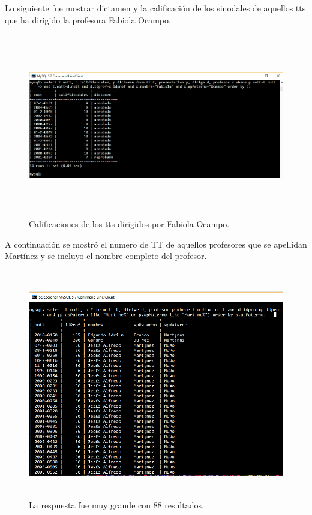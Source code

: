 \documentclass[12pt, titlepage]{article}
\begin{document}
	Lo siguiente fue mostrar dictamen y la calificación de los sinodales de aquellos tts que ha dirigido la profesora Fabiola Ocampo.
	
	\begin{figure}[H]
		\begin{center}
			\includegraphics[width=16cm, height=8cm]{img/tres.png}
			\caption{Calificaciones de los tts dirigidos por Fabiola Ocampo.}
			\label{fig:tres}
		\end{center}
	\end{figure}
	
	A continuación se mostró el numero de TT de aquellos profesores que se apellidan Martínez y se incluyo el nombre completo del profesor.
	
	\begin{figure}[H]
		\begin{center}
			\includegraphics[width=16cm, height=10cm]{img/cuatro.png}
			\caption{La respuesta fue muy grande con 88 resultados.}
			\label{fig:ejercicio5}
		\end{center}
	\end{figure}
	
\end{document}
